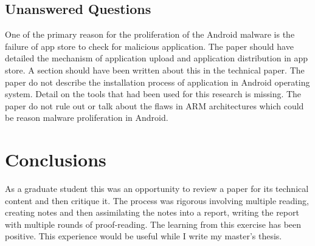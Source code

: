 \documentclass[12pt]{article}
\begin{document}
\subsection{Unanswered Questions}\label{ref:critique_method}
One of the primary reason for the proliferation of the Android malware is the failure of app store to check for malicious application. The paper should have detailed the mechanism of application upload and application distribution in app store. A section should have been written about this in the technical paper. The paper do not describe the installation process of application in Android operating system. Detail on the tools that had been used for this research is missing. The paper do not rule out or talk about the flaws in ARM architectures which could be reason malware proliferation in Android.

\section{Conclusions}\label{ref:critique_conclusions}
As a graduate student this was an opportunity to review a paper for its technical content and then critique it. The process was rigorous involving multiple reading, creating notes and then assimilating the notes into a report, writing the report with multiple rounds of proof-reading. The learning from this exercise has been positive. This experience would be useful while I write my master's thesis.
%


\end{document}
